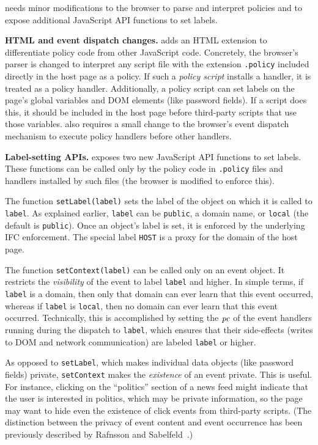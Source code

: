 {\sys} needs minor modifications to the browser to parse and interpret
policies and to expose additional JavaScript API functions to set
labels.

\medskip \noindent \textbf{HTML and event dispatch changes.}
{\sys} adds an HTML extension to differentiate policy code from other
JavaScript code. Concretely, the browser's parser is changed to
interpret any script file with the extension \texttt{.policy} included
directly in the host page as a policy. If such a \emph{policy script}
installs a handler, it is treated as a policy handler. Additionally, a
policy script can set labels on the page's global variables and DOM
elements (like password fields). If a script does this, it should be
included in the host page before third-party scripts that use those
variables. {\sys} also requires a small change to the browser's event
dispatch mechanism to execute policy handlers before other handlers.

\medskip \noindent \textbf{Label-setting APIs.}
{\sys} exposes two new JavaScript API functions to set labels. These
functions can be called only by the policy code in \texttt{.policy}
files and handlers installed by such files (the browser is modified to
enforce this).

The function \texttt{setLabel(label)} sets the label of the object on
which it is called to \texttt{label}. As explained
earlier, \texttt{label} can be \texttt{public}, a domain name,
or \texttt{local} (the default is \texttt{public}). Once an object's
label is set, it is enforced by the underlying IFC enforcement. The
special label \texttt{HOST} is a proxy for the domain of the host
page.

The function \texttt{setContext(label)} can be called only on an event
object. It restricts the \emph{visibility} of the event to
label \texttt{label} and higher. In simple terms, if \texttt{label} is
a domain, then only that domain can ever learn that this event
occurred, whereas if \texttt{label} is \texttt{local}, then no domain
can ever learn that this event occurred. Technically, this is
accomplished by setting the $\mathit{pc}$ of the 
event handlers running during the dispatch to \texttt{label}, which
ensures that their side-effects (writes to DOM and network
communication) are labeled \texttt{label} or higher.

As opposed to \texttt{setLabel}, which makes individual data objects
(like password fields) private, \texttt{setContext} makes the
\emph{existence} of an event private. This is useful.
For instance, clicking on the ``politics'' section of a news feed
might indicate that the user is interested in politics, which may be
private information, so the page may want to hide even the existence
of click events from third-party scripts. (The distinction between the
privacy of event content and event occurrence has been previously
described by Rafnsson and Sabelfeld~\cite{Rafnsson-csf13}.)

